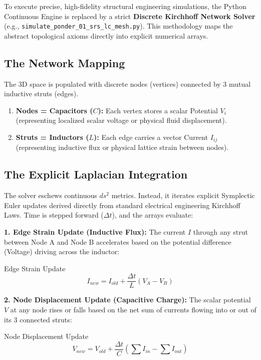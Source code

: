To execute precise, high-fidelity structural engineering simulations, the Python Continuous Engine is replaced by a strict \textbf{Discrete Kirchhoff Network Solver} (e.g., \texttt{simulate\_ponder\_01\_srs\_lc\_mesh.py}). This methodology maps the abstract topological axioms directly into explicit numerical arrays.

\subsection{The Network Mapping}
The 3D space is populated with discrete nodes (vertices) connected by 3 mutual inductive struts (edges).
\begin{enumerate}
    \item \textbf{Nodes = Capacitors ($C$):} Each vertex stores a scalar Potential $V_i$ (representing localized scalar voltage or physical fluid displacement).
    \item \textbf{Struts = Inductors ($L$):} Each edge carries a vector Current $I_{ij}$ (representing inductive flux or physical lattice strain between nodes).
\end{enumerate}

\subsection{The Explicit Laplacian Integration}
The solver eschews continuous $ds^2$ metrics. Instead, it iterates explicit Symplectic Euler updates derived directly from standard electrical engineering Kirchhoff Laws. Time is stepped forward ($\Delta t$), and the arrays evaluate:

\textbf{1. Edge Strain Update (Inductive Flux):}
The current $I$ through any strut between Node A and Node B accelerates based on the potential difference (Voltage) driving across the inductor:
\begin{resultbox}{Edge Strain Update}
\begin{equation}
    I_{new} = I_{old} + \frac{\Delta t}{L} \left( V_A - V_B \right)
\end{equation}
\end{resultbox}

\textbf{2. Node Displacement Update (Capacitive Charge):}
The scalar potential $V$ at any node rises or falls based on the net sum of currents flowing into or out of its 3 connected struts:
\begin{resultbox}{Node Displacement Update}
\begin{equation}
    V_{new} = V_{old} + \frac{\Delta t}{C} \left( \sum I_{in} - \sum I_{out} \right)
\end{equation}
\end{resultbox}

